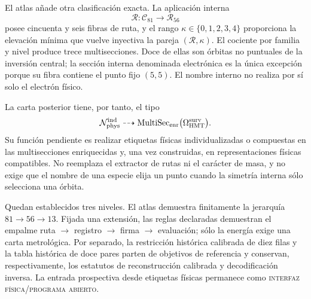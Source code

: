 El atlas añade otra clasificación exacta. La aplicación interna
\[
 \mathcal R:\mathcal C_{81}\longrightarrow\mathcal R_{56}
\]
posee cincuenta y seis fibras de ruta, y el rango
\(\kappa\in\{0,1,2,3,4\}\) proporciona la elevación mínima que vuelve
inyectiva la pareja \((\mathcal R,\kappa)\). El cociente por familia y nivel
produce trece multisecciones. Doce de ellas son órbitas no puntuales de la
inversión central; la sección interna denominada electrónica es la única
excepción porque su fibra contiene el punto fijo \((5,5)\). El nombre interno
no realiza por sí solo el electrón físico.

La carta posterior tiene, por tanto, el tipo
\[
 \mathcal N_{\rm phys}^{\rm ind}
 \dashrightarrow
 \operatorname{MultiSec}_{\rm enr}
 \bigl(\Omega_{\rm HMT}^{\rm surv}\bigr).
\]
Su función pendiente es realizar etiquetas físicas individualizadas o
compuestas en las multisecciones enriquecidas y, una vez construidas, en
representaciones físicas compatibles. No reemplaza el
extractor de rutas ni el carácter de masa, y no exige que el nombre de una
especie elija un punto cuando la simetría interna sólo selecciona una órbita.

Quedan establecidos tres niveles. El atlas demuestra finitamente la jerarquía
\(81\to56\to13\). Fijada una extensión, las reglas declaradas demuestran el
empalme ruta \(\longrightarrow\) registro \(\longrightarrow\) firma
\(\longrightarrow\) evaluación; sólo la energía exige una carta metrológica.
Por separado, la restricción histórica calibrada de diez filas y la tabla
histórica de doce pares parten de objetivos de referencia y conservan,
respectivamente, los estatutos de reconstrucción calibrada y decodificación
inversa. La entrada prospectiva desde etiquetas físicas permanece como
\textsc{interfaz física}/\textsc{programa abierto}.
